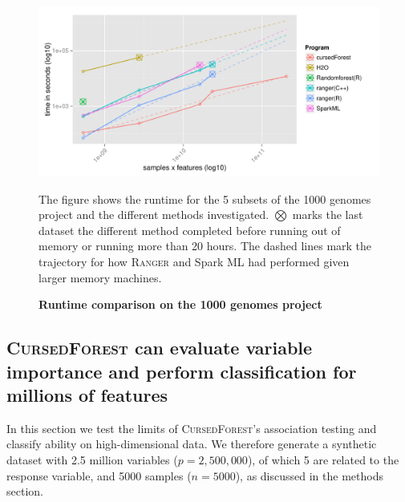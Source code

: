 \documentclass[10pt,letterpaper]{article}
\newcommand{\cursedforest}{\textsc{CursedForest}\xspace}
\newcommand{\ranger}{\textsc{Ranger}\xspace}
\begin{document}
\begin{figure}[tbhp]
  \begin{adjustwidth}{-1.00in}{0in}
    \caption{\textbf{Runtime comparison on the 1000 genomes project}}
    \label{figure:1000genomes}
    \includegraphics[totalheight=8cm]{./figs/1000genomesRuntime.pdf}
    \begin{flushleft}
      The figure shows the runtime for the 5 subsets of the 1000 genomes project and the different methods investigated.
      $\bigotimes$ marks the last dataset the different method completed before running out of memory or running more than
      20 hours. The dashed lines mark the trajectory for how \ranger and Spark ML had performed given larger memory machines.
    \end{flushleft}
  \end{adjustwidth}
\end{figure}




\subsection{\cursedforest can evaluate variable importance and perform classification for millions of features}
In this section we test the limits of \cursedforest's association testing and classify ability on high-dimensional data. 
We therefore generate a synthetic dataset with 2.5 million variables ($p=2,500,000$), of which 5 
are related to the response variable, and 5000 samples ($n=5000$), as discussed in the methods section.
\end{document}
